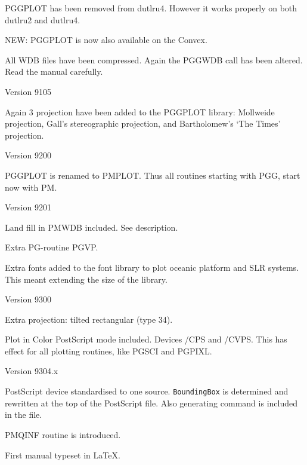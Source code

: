 \documentclass[titlepage,a4paper]{article}
\begin{document}
\begin{leftitemize}
\begin{leftitemize}
\item PGGPLOT has been removed from dutlru4. However it works properly on both
  dutlru2 and dutlru4.
\item NEW: PGGPLOT is now also available on the Convex.
\item All WDB files have been compressed.
  Again the PGGWDB call has been altered.
  Read the manual carefully.
\end{leftitemize}
\item Version 9105
\begin{leftitemize}
\item Again 3 projection have been added to the PGGPLOT library:
  Mollweide projection, Gall's stereographic projection, and Bartholomew's
  `The Times' projection.
\end{leftitemize}
\item Version 9200
\begin{leftitemize}
\item PGGPLOT is renamed to PMPLOT. Thus all routines starting with PGG, start
  now with PM.
\end{leftitemize}
\item Version 9201
\begin{leftitemize}
\item Land fill in PMWDB included. See description.
\item Extra PG-routine PGVP.
\item Extra fonts added to the font library to plot oceanic platform and SLR
  systems. This meant extending the size of the library.
\end{leftitemize}
\item Version 9300
\begin{leftitemize}
\item Extra projection: tilted rectangular (type 34).
\item Plot in Color PostScript mode included. Devices /CPS and
  /CVPS. This has effect for all plotting routines, like PGSCI and PGPIXL.
\end{leftitemize}
\item Version 9304.x
\begin{leftitemize}
\item PostScript device standardised to one source. \verb|BoundingBox| is
  determined and rewritten at the top of the PostScript file. Also
  generating command is included in the file.
\item PMQINF routine is introduced.
\item First manual typeset in \LaTeX.

\end{leftitemize}
\end{leftitemize}
\end{document}
